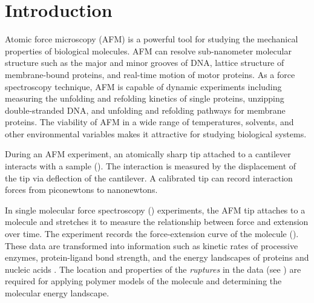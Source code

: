 \chapter{Introduction}

Atomic force microscopy (AFM) is a powerful tool for studying the mechanical properties of biological molecules.  AFM can resolve sub-nanometer molecular structure such as the major and minor grooves of DNA, lattice structure of membrane-bound proteins, and real-time motion of motor proteins. As a force spectroscopy technique, AFM is capable of dynamic experiments including measuring the unfolding and refolding kinetics of single proteins, unzipping double-stranded DNA, and unfolding and refolding pathways for membrane proteins. The viability of AFM in a wide range of temperatures, solvents, and other environmental variables makes it attractive for studying biological systems. 

During an AFM experiment, an atomically sharp tip attached to a cantilever interacts with a sample (). The interaction is measured by the displacement of the tip via deflection of the cantilever. A calibrated tip can record interaction forces from piconewtons to nanonewtons. 

In single molecular force spectroscopy (\singlemol{}) experiments, the AFM tip attaches to a molecule and stretches it to measure the relationship between force and extension over time. The experiment records the force-extension curve of the molecule (). These data are transformed into information such as kinetic rates of processive enzymes, protein-ligand bond strength,  and the energy landscapes of proteins and nucleic acids . The location and properties of the \textit{ruptures} in the data (see ) are required for applying polymer models of the molecule and determining the molecular energy landscape.

